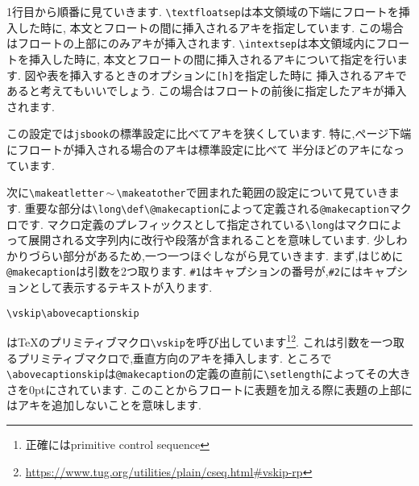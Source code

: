 1行目から順番に見ていきます.
\verb|\textfloatsep|は本文領域の下端にフロートを挿入した時に,
本文とフロートの間に挿入されるアキを指定しています.
この場合はフロートの上部にのみアキが挿入されます.
\verb|\intextsep|は本文領域内にフロートを挿入した時に,
本文とフロートの間に挿入されるアキについて指定を行います.
図や表を挿入するときのオプションに\texttt{[h]}を指定した時に
挿入されるアキであると考えてもいいでしょう.
この場合はフロートの前後に指定したアキが挿入されます.

この設定では\texttt{jsbook}の標準設定に比べてアキを狭くしています.
特に,ページ下端にフロートが挿入される場合のアキは標準設定に比べて
半分ほどのアキになっています.

次に\verb|\makeatletter|\,$\sim$\,\verb|\makeatother|で囲まれた範囲の設定について見ていきます.
重要な部分は\verb|\long\def\@makecaption|によって定義される\verb|@makecaption|マクロです.
マクロ定義のプレフィックスとして指定されている\verb|\long|はマクロによって展開される文字列内に改行や段落が含まれることを意味しています.
少しわかりづらい部分があるため,一つ一つほぐしながら見ていきます.
まず,はじめに\verb|@makecaption|は引数を2つ取ります.
\verb|#1|はキャプションの番号が,\verb|#2|にはキャプションとして表示するテキストが入ります.

\begin{verbatim}
\vskip\abovecaptionskip
\end{verbatim}%
は{\TeX}のプリミティブマクロ\verb|\vskip|を呼び出しています\footnote{正確にはprimitive control sequence}\footnote{\url{https://www.tug.org/utilities/plain/cseq.html#vskip-rp}}.
これは引数を一つ取るプリミティブマクロで,垂直方向のアキを挿入します.
ところで\verb|\abovecaptionskip|は\verb|@makecaption|の定義の直前に\verb|\setlength|によってその大きさを0ptにされています.
このことからフロートに表題を加える際に表題の上部にはアキを追加しないことを意味します.

